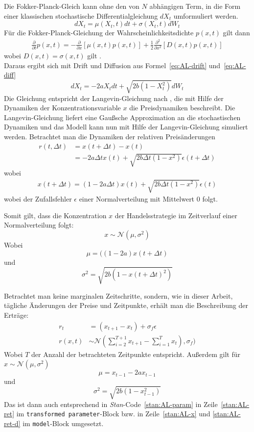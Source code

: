 \documentclass[ngerman]{ttlab-qualify}
\begin{document}
Die Fokker-Planck-Gleich kann ohne den von $N$ abhängigen Term, in die Form einer klassischen stochastische Differentialgleichung $dX_t$ umformuliert werden.
\[dX_t =\mu(X_t,t)dt +\sigma(X_t,t)dW_t\]
Für die Fokker-Planck-Gleichung der Wahrscheinlichkeitsdichte $p(x,t)$ gilt dann
\begin{align}
\frac{\partial}{\partial t}p(x,t)=-\frac{\partial}{\partial x}[\mu(x,t)p(x,t)]+\frac{1}{2}\frac{\partial^2}{\partial x^2}[D(x,t)p(x,t)] 
\end{align}
wobei $D(x,t)=\sigma(x,t)$ gilt \parencite{bertschinger:2019}.\\
Daraus ergibt sich mit Drift und Diffusion aus Formel~\ref{eq:AL-drift} und~\ref{eq:AL-diff}
\[dX_t =-2aX_t dt+\sqrt{2b(1-X_t^2)}dW_t\]
Die Gleichung entspricht der Langevin-Gleichung nach \parencite{AL:2008}, die mit Hilfe der Dynamiken der Konzentrationsvariable $x$ die Preisdynamiken beschreibt.
Die Langevin-Gleichung liefert eine Gaußsche Approximation an die stochastischen Dynamiken und das Modell kann nun mit Hilfe der Langevin-Gleichung simuliert werden. 
Betrachtet man die Dynamiken der relativen Preisänderungen
\begin{align}
r(t,\Delta t) &= x(t+\Delta t)-x(t)\nonumber \\
&=-2a\Delta tx(t)+\sqrt{2b\Delta t(1-x^2)}\epsilon(t+\Delta t)\nonumber 
\end{align}
wobei 
\begin{align}
\label{eq:AL-langevin}
x(t+\Delta t) = (1-2a\Delta t)x(t) + \sqrt{2b\Delta t(1-x^2)}\epsilon(t)
\end{align}
wobei der Zufallsfehler $\epsilon$ einer Normalverteilung mit Mittelwert 0 folgt.

Somit gilt, dass die Konzentration $x$ der Handelsstrategie im Zeitverlauf einer Normalverteilung folgt:
\[x\sim\mathcal{N}(\mu, \sigma^2)\]
Wobei
\[\mu = ((1-2a)x(t+\Delta t)\]
und 
\[\sigma^2 = \sqrt{2b(1-x(t+\Delta t)^2)}\]

Betrachtet man keine marginalen Zeitschritte, sondern, wie in dieser Arbeit, tägliche Änderungen der Preise und Zeitpunkte, erhält man die Beschreibung der Erträge:
\begin{align}
r_t & = (x_{t+1}-x_t)+\sigma_f\epsilon \nonumber \\
r(x,t) &\sim \mathcal{N}\left(\sum_{i=2}^{T+1} x_{t+1}-\sum_{i=1}^T x_t\right),\sigma_f)\nonumber 
\end{align}
Wobei $T$ der Anzahl der betrachteten Zeitpunkte entspricht.
Außerdem gilt für $x\sim\mathcal{N}(\mu,\sigma^2)$
\[\mu = x_{t-1}-2ax_{t-1}\]
und 
\[\sigma^2 = \sqrt{2b(1-x_{t-1}^2)}\]
Das ist dann auch entsprechend in \textit{Stan}-Code~\ref{stan:AL-param} in Zeile~\ref{stan:AL-ret} im \verb|transformed parameter|-Block bzw. in Zeile~\ref{stan:AL-x} und \ref{stan:AL-ret-d} im \verb|model|-Block umgesetzt.
\end{document}
